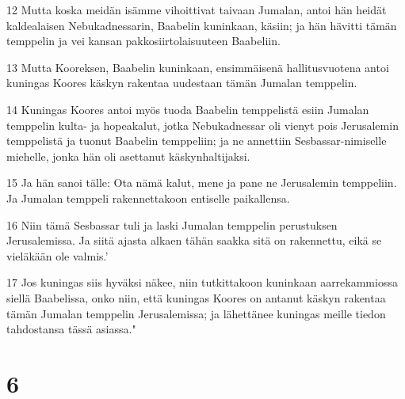 \par 12 Mutta koska meidän isämme vihoittivat taivaan Jumalan, antoi hän heidät kaldealaisen Nebukadnessarin, Baabelin kuninkaan, käsiin; ja hän hävitti tämän temppelin ja vei kansan pakkosiirtolaisuuteen Baabeliin.
\par 13 Mutta Kooreksen, Baabelin kuninkaan, ensimmäisenä hallitusvuotena antoi kuningas Koores käskyn rakentaa uudestaan tämän Jumalan temppelin.
\par 14 Kuningas Koores antoi myös tuoda Baabelin temppelistä esiin Jumalan temppelin kulta- ja hopeakalut, jotka Nebukadnessar oli vienyt pois Jerusalemin temppelistä ja tuonut Baabelin temppeliin; ja ne annettiin Sesbassar-nimiselle miehelle, jonka hän oli asettanut käskynhaltijaksi.
\par 15 Ja hän sanoi tälle: Ota nämä kalut, mene ja pane ne Jerusalemin temppeliin. Ja Jumalan temppeli rakennettakoon entiselle paikallensa.
\par 16 Niin tämä Sesbassar tuli ja laski Jumalan temppelin perustuksen Jerusalemissa. Ja siitä ajasta alkaen tähän saakka sitä on rakennettu, eikä se vieläkään ole valmis.'
\par 17 Jos kuningas siis hyväksi näkee, niin tutkittakoon kuninkaan aarrekammiossa siellä Baabelissa, onko niin, että kuningas Koores on antanut käskyn rakentaa tämän Jumalan temppelin Jerusalemissa; ja lähettänee kuningas meille tiedon tahdostansa tässä asiassa."

\chapter{6}

